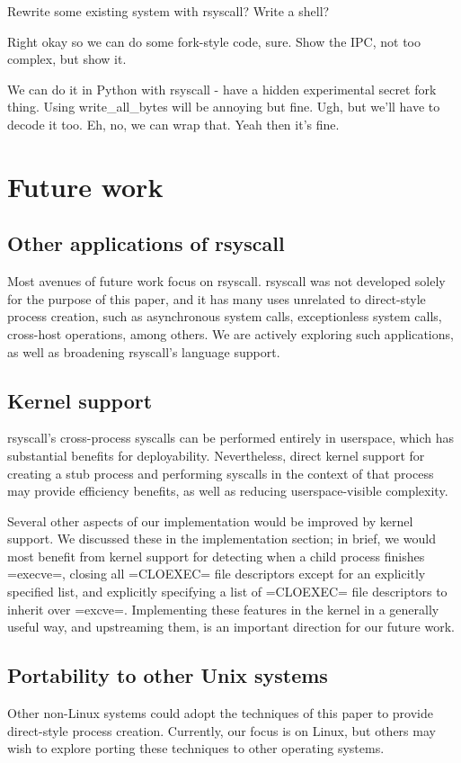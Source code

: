 \documentclass{acmart}
\begin{document}
Rewrite some existing system with rsyscall?
Write a shell?

Right okay so we can do some fork-style code, sure.
Show the IPC, not too complex, but show it.

We can do it in Python with rsyscall - have a hidden experimental secret fork thing.
Using write_all_bytes will be annoying but fine.
Ugh, but we'll have to decode it too.
Eh, no, we can wrap that.
Yeah then it's fine.
\section{Future work}\label{future_work}
\subsection{Other applications of rsyscall}
Most avenues of future work focus on rsyscall.
rsyscall was not developed solely for the purpose of this paper,
and it has many uses unrelated to direct-style process creation,
such as asynchronous system calls, exceptionless system calls\cite{flexsc}, cross-host operations, among others.
We are actively exploring such applications,
as well as broadening rsyscall's language support.
\subsection{Kernel support}
rsyscall's cross-process syscalls can be performed entirely in userspace,
which has substantial benefits for deployability.
Nevertheless, direct kernel support for creating a stub process and performing syscalls in the context of that process
may provide efficiency benefits, as well as reducing userspace-visible complexity.

Several other aspects of our implementation would be improved by kernel support.
We discussed these in the implementation section;
in brief, we would most benefit from kernel support for
detecting when a child process finishes =execve=,
closing all =CLOEXEC= file descriptors except for an explicitly specified list,
and explicitly specifying a list of =CLOEXEC= file descriptors to inherit over =excve=.
Implementing these features in the kernel in a generally useful way, and upstreaming them,
is an important direction for our future work.
\subsection{Portability to other Unix systems}
Other non-Linux systems
could adopt the techniques of this paper
to provide direct-style process creation.
Currently, our focus is on Linux,
but others may wish to explore porting these techniques to other operating systems.
\end{document}
